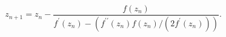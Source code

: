 \[z_{n+1}=z_{n}-\frac{f(z_{n})}{f^{\prime}(z_{n})-(f^{\prime\prime}(z_{n})f(z_{n%
})/(2f^{\prime}(z_{n})))}.\]